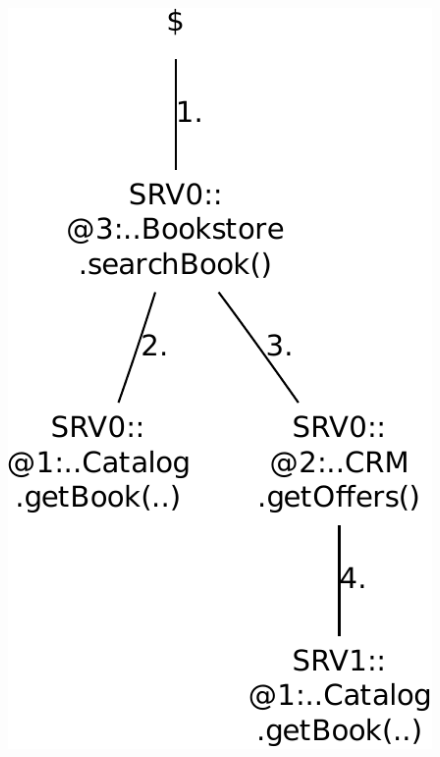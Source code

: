 \begin{figure}[h]
{\ \ \includegraphics[scale=0.4]{images/example-plots/callTree-6488138950668976131-crop}\ \ 
}
\end{figure}
